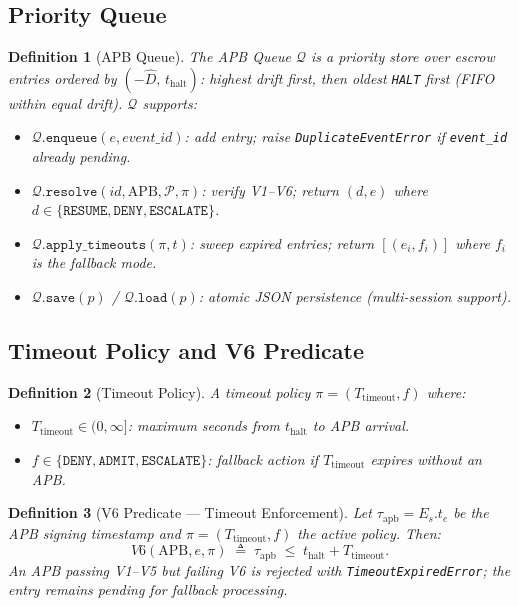 \documentclass[11pt]{article}
\newtheorem{definition}{Definition}[section]
\newcommand{\Dhat}{\widehat{D}}
\newcommand{\HALT}{\texttt{HALT}}
\newcommand{\RESUME}{\texttt{RESUME}}
\newcommand{\DENY}{\texttt{DENY}}
\newcommand{\ADMIT}{\texttt{ADMIT}}
\newcommand{\ESCALATE}{\texttt{ESCALATE}}
\newcommand{\Es}{E_s}
\newcommand{\APB}{\mathrm{APB}}
\newcommand{\thalt}{t_{\mathrm{halt}}}
\newcommand{\tapb}{\tau_{\mathrm{apb}}}
\newcommand{\Ttimeout}{T_{\mathrm{timeout}}}
\newcommand{\Queue}{\mathcal{Q}}
\begin{document}
\subsection{Priority Queue}
\label{sec:queue}

\begin{definition}[APB Queue]
The \emph{APB Queue} $\Queue$ is a priority store over escrow entries
ordered by $(-\Dhat,\, \thalt)$: highest drift first, then oldest
\HALT{} first (FIFO within equal drift). $\Queue$ supports:
\begin{itemize}[itemsep=1pt]
  \item $\Queue.\mathtt{enqueue}(e, \mathit{event\_id})$: add entry; raise
        \texttt{DuplicateEventError} if \texttt{event\_id} already pending.
  \item $\Queue.\mathtt{resolve}(id, \APB, \mathcal{P}, \pi)$:
        verify V1--V6; return $(d, e)$ where $d \in \{\RESUME, \DENY, \ESCALATE\}$.
  \item $\Queue.\mathtt{apply\_timeouts}(\pi, t)$: sweep expired entries;
        return $[(e_i, f_i)]$ where $f_i$ is the fallback mode.
  \item $\Queue.\mathtt{save}(p)$ / $\Queue.\mathtt{load}(p)$:
        atomic JSON persistence (multi-session support).
\end{itemize}
\end{definition}

\subsection{Timeout Policy and V6 Predicate}
\label{sec:timeout}

\begin{definition}[Timeout Policy]
A \emph{timeout policy} $\pi = (\Ttimeout, f)$ where:
\begin{itemize}[itemsep=1pt]
  \item $\Ttimeout \in (0, \infty]$: maximum seconds from $\thalt$ to
        APB arrival.
  \item $f \in \{\DENY, \ADMIT, \ESCALATE\}$: fallback action if
        $\Ttimeout$ expires without an APB.
\end{itemize}
\end{definition}

\begin{definition}[V6 Predicate --- Timeout Enforcement]
\label{def:v6}
Let $\tapb = \Es.t_e$ be the APB signing timestamp and
$\pi = (\Ttimeout, f)$ the active policy. Then:
\[
  V6(\APB, e, \pi)
  \;\triangleq\;
  \tapb \;\le\; \thalt + \Ttimeout.
\]
An APB passing V1--V5 but failing V6 is rejected with
\texttt{TimeoutExpiredError}; the entry remains pending for fallback
processing.
\end{definition}
\end{document}

